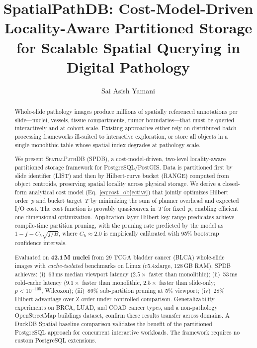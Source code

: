 \documentclass[sigconf]{acmart}
\begin{document}
\title{SpatialPathDB: Cost-Model-Driven Locality-Aware Partitioned Storage for Scalable Spatial Querying in Digital Pathology}

\author{Sai Asish Yamani}

\begin{abstract}
Whole-slide pathology images produce millions of spatially referenced annotations per slide---nuclei, vessels, tissue compartments, tumor boundaries---that must be queried interactively and at cohort scale.
Existing approaches either rely on distributed batch-processing frameworks ill-suited to interactive exploration, or store all objects in a single monolithic table whose spatial index degrades at pathology scale.

We present \textsc{SpatialPathDB} (SPDB), a cost-model-driven, two-level locality-aware partitioned storage framework for PostgreSQL/PostGIS.
Data is partitioned first by slide identifier (LIST) and then by Hilbert-curve bucket (RANGE) computed from object centroids, preserving spatial locality across physical storage.
We derive a closed-form analytical cost model (Eq.~\ref{eq:cost_objective}) that jointly optimizes Hilbert order~$p$ and bucket target~$T$ by minimizing the sum of planner overhead and expected I/O cost.
The cost function is provably quasiconvex in~$T$ for fixed~$p$, enabling efficient one-dimensional optimization.
Application-layer Hilbert key range predicates achieve compile-time partition pruning, with the pruning rate predicted by the model as $1 - f - C_h\sqrt{f/B}$, where $C_h \approx 2.0$ is empirically calibrated with 95\% bootstrap confidence intervals.

Evaluated on \textbf{42.1\,M nuclei} from 29 TCGA bladder cancer (BLCA) whole-slide images with \emph{cache-isolated} benchmarks on Linux (r5.4xlarge, 128\,GB RAM), SPDB achieves:
(i)~63\,ms median viewport latency ($2.5\times$ faster than monolithic);
(ii)~53\,ms cold-cache latency ($9.1\times$ faster than monolithic, $2.5\times$ faster than slide-only; $p < 10^{-105}$, Wilcoxon);
(iii)~89\% sub-partition pruning at 5\% viewport;
(iv)~28\% Hilbert advantage over Z-order under controlled comparison.
Generalizability experiments on BRCA, LUAD, and COAD cancer types, and a non-pathology OpenStreetMap buildings dataset, confirm these results transfer across domains.
A DuckDB Spatial baseline comparison validates the benefit of the partitioned PostgreSQL approach for concurrent interactive workloads.
The framework requires no custom PostgreSQL extensions.
\end{abstract}
\end{document}
